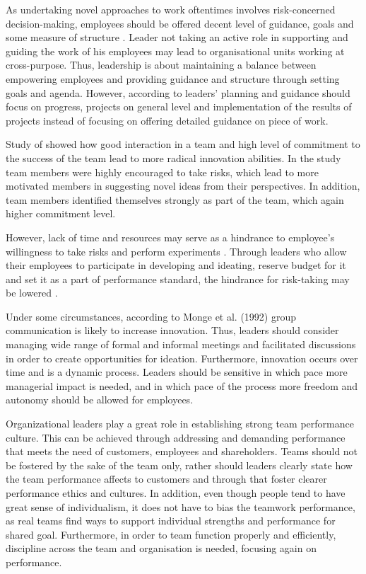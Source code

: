 As undertaking novel approaches to work oftentimes involves risk-concerned decision-making, employees should be offered decent level of guidance, goals and some measure of structure \citep{jung2003role}. Leader not taking an active role in supporting and guiding the work of his employees may lead to organisational units working at cross-purpose. Thus, leadership is about maintaining a balance between empowering employees and providing guidance and structure through setting goals and agenda. However, according to \citet{mumford2002leading} leaders' planning and guidance should focus on progress, projects on general level and implementation of the results of projects instead of focusing on offering detailed guidance on piece of work. 

Study of \citet{sethi2001cross} showed how good interaction in a team and high level of commitment to the success of the team lead to more radical innovation abilities. In the study team members were highly encouraged to take risks, which lead to more motivated members in suggesting novel ideas from their perspectives. In addition, team members identified themselves strongly as part of the team, which again higher commitment level. \citep{sethi2001cross} 

However, lack of time and resources may serve as a hindrance to employee's willingness to take risks and perform experiments \citep{jung2003role}. Through leaders who allow their employees to participate in developing and ideating, reserve budget for it and set it as a part of performance standard, the hindrance for risk-taking may be lowered \citep{jung2003role}.

Under some circumstances, according to Monge et al. (1992) \citet{monge1992communication} group communication is likely to increase innovation. Thus, leaders should consider managing wide range of formal and informal meetings and facilitated discussions in order to create opportunities for ideation. Furthermore, innovation occurs over time and is a dynamic process. Leaders should be sensitive in which pace more managerial impact is needed, and in which pace of the process more freedom and autonomy should be allowed for employees. \citep{monge1992communication} 

Organizational leaders play a great role in establishing strong team performance culture. This can be achieved through addressing and demanding performance that meets the need of customers, employees and shareholders. Teams should not be fostered by the sake of the team only, rather should leaders clearly state how the team performance affects to customers and through that foster clearer performance ethics and cultures. In addition, even though people tend to have great sense of individualism, it does not have to bias the teamwork performance, as real teams find ways to support individual strengths and performance for shared goal. Furthermore, in order to team function properly and efficiently, discipline across the team and organisation is needed, focusing again on performance.  \citep{katzenbach1993wisdom}
 

